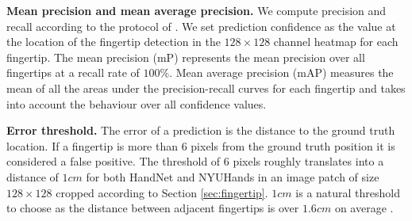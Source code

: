 \documentclass{bmvc2k}
\begin{document}
\textbf{Mean precision and mean average precision.} We compute precision and recall according to the protocol of \cite{voc11}. We set prediction confidence as the value at the location of the fingertip detection in the $128\times 128$ channel heatmap for each fingertip. The mean precision (mP) represents the mean precision over all fingertips at a recall rate of $100\%$. Mean average precision (mAP) measures the mean of all the areas under the precision-recall curves for each fingertip and takes into account the behaviour over all confidence values. 

\textbf{Error threshold.} The error of a prediction is the distance to the ground truth location. If a fingertip is more than 6 pixels from the ground truth position it is considered a false positive. The threshold of 6 pixels roughly translates into a distance of $1cm$ for both HandNet and NYUHands in an image patch of size $128\times 128$ cropped according to Section \ref{sec:fingertip}. $1cm$ is a natural threshold to choose as the distance between adjacent fingertips is over $1.6cm$ on average \cite{dandekar2003}. 
\end{document}
